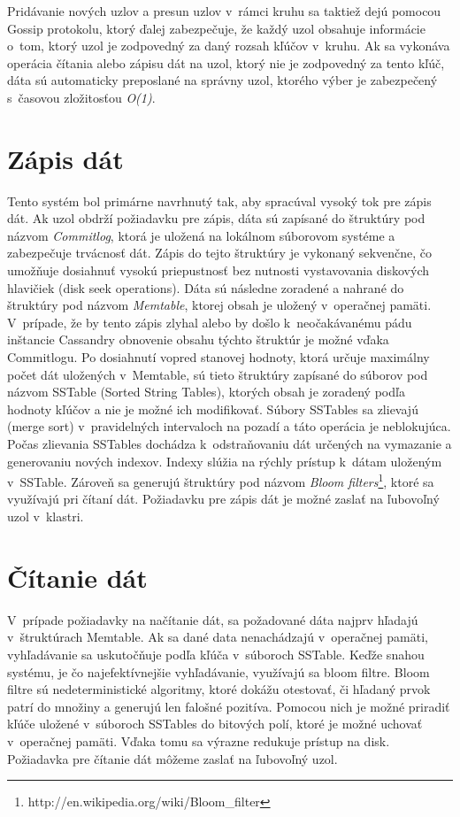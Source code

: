 \documentclass[11pt,twoside,a4paper]{book}
\begin{document}
Pridávanie nových uzlov a presun uzlov v~rámci kruhu sa taktiež dejú pomocou Gossip protokolu, ktorý ďalej zabezpečuje, že každý uzol obsahuje informácie o~tom, ktorý uzol je zodpovedný za daný rozsah kľúčov v~kruhu. Ak sa vykonáva operácia čítania alebo zápisu dát na uzol, ktorý nie je zodpovedný za tento kľúč, dáta sú automaticky preposlané na správny uzol, ktorého výber je zabezpečený s~časovou zložitosťou \textit{O(1)}.


\section{Zápis dát}
Tento systém bol primárne navrhnutý tak, aby spracúval vysoký tok pre zápis dát. Ak uzol obdrží požiadavku pre zápis, dáta sú zapísané do štruktúry pod názvom \emph{Commitlog}, ktorá je uložená na lokálnom súborovom systéme a zabezpečuje trvácnosť dát. Zápis do tejto štruktúry je vykonaný sekvenčne, čo umožňuje dosiahnuť vysokú priepustnosť bez nutnosti vystavovania diskových hlavičiek (disk seek operations). Dáta sú následne zoradené a nahrané do štruktúry pod názvom \emph{Memtable}, ktorej obsah je uložený v~operačnej pamäti. V~prípade, že by tento zápis zlyhal alebo by došlo k~neočakávanému pádu inštancie Cassandry obnovenie obsahu týchto štruktúr je možné vďaka Commitlogu. Po dosiahnutí vopred stanovej hodnoty, ktorá určuje maximálny počet dát uložených v~Memtable, sú tieto štruktúry zapísané do súborov pod názvom SSTable (Sorted String Tables), ktorých obsah je zoradený podľa hodnoty kľúčov a nie je možné ich modifikovať. Súbory SSTables sa zlievajú (merge sort) v~pravidelných intervaloch na pozadí a táto operácia je neblokujúca. Počas zlievania SSTables dochádza k~odstraňovaniu dát určených na vymazanie a generovaniu nových indexov. Indexy slúžia na rýchly prístup k~dátam uloženým v~SSTable. Zároveň sa generujú štruktúry pod názvom \emph{Bloom filters}\footnote{http://en.wikipedia.org/wiki/Bloom\_filter}, ktoré sa využívajú pri čítaní dát. Požiadavku pre zápis dát je možné zaslať na ľubovoľný uzol v~klastri.


\section{Čítanie dát}
V~prípade požiadavky na načítanie dát, sa požadované dáta najprv hľadajú v~štruktúrach Memtable. Ak sa dané data nenachádzajú v~operačnej pamäti, vyhľadávanie sa uskutočňuje podľa kľúča v~súboroch SSTable. Keďže snahou systému, je čo najefektívnejšie vyhľadávanie, využívajú sa bloom filtre. Bloom filtre sú nedeterministické algoritmy, ktoré dokážu otestovať, či hľadaný prvok patrí do množiny a generujú len falošné pozitíva. Pomocou nich je možné priradiť kľúče uložené v~súboroch SSTables do bitových polí, ktoré je možné uchovať v~operačnej pamäti. Vďaka tomu sa výrazne redukuje prístup na disk. Požiadavka pre čítanie dát môžeme zaslať na ľubovoľný uzol.
\end{document}
